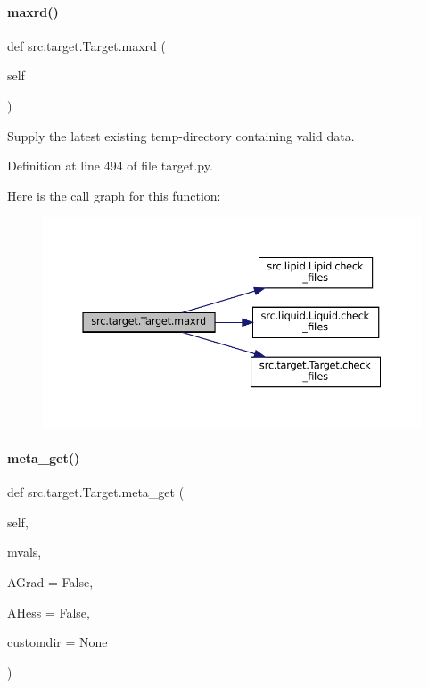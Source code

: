 \paragraph{\texorpdfstring{maxrd()}{maxrd()}}
{\footnotesize\ttfamily def src.\+target.\+Target.\+maxrd (\begin{DoxyParamCaption}\item[{}]{self }\end{DoxyParamCaption})}



Supply the latest existing temp-\/directory containing valid data. 



Definition at line 494 of file target.\+py.

Here is the call graph for this function\+:
\nopagebreak
\begin{figure}[H]
\begin{center}
\leavevmode
\includegraphics[width=350pt]{classsrc_1_1target_1_1Target_ac295603ea071c6b6db55b7c2cf89890a_cgraph}
\end{center}
\end{figure}
\mbox{\label{classsrc_1_1target_1_1Target_a14ccb9a63ebc92a83ead58965f13fcc7}} 
\paragraph{\texorpdfstring{meta\+\_\+get()}{meta\_get()}}
{\footnotesize\ttfamily def src.\+target.\+Target.\+meta\+\_\+get (\begin{DoxyParamCaption}\item[{}]{self,  }\item[{}]{mvals,  }\item[{}]{A\+Grad = {\ttfamily False},  }\item[{}]{A\+Hess = {\ttfamily False},  }\item[{}]{customdir = {\ttfamily None} }\end{DoxyParamCaption})}



